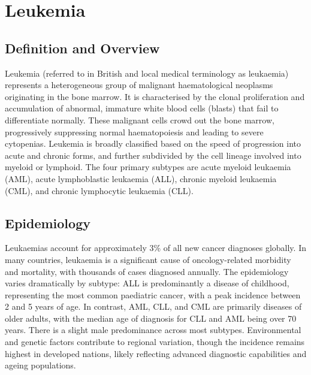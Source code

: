 \chapter{Leukemia}

\section*{Definition and Overview}
Leukemia (referred to in British and local medical terminology as leukaemia) represents a heterogeneous group of malignant haematological neoplasms originating in the bone marrow. It is characterised by the clonal proliferation and accumulation of abnormal, immature white blood cells (blasts) that fail to differentiate normally. These malignant cells crowd out the bone marrow, progressively suppressing normal haematopoiesis and leading to severe cytopenias. Leukemia is broadly classified based on the speed of progression into acute and chronic forms, and further subdivided by the cell lineage involved into myeloid or lymphoid. The four primary subtypes are acute myeloid leukaemia (AML), acute lymphoblastic leukaemia (ALL), chronic myeloid leukaemia (CML), and chronic lymphocytic leukaemia (CLL).

\section*{Epidemiology}
Leukaemias account for approximately 3\% of all new cancer diagnoses globally. In many countries, leukaemia is a significant cause of oncology-related morbidity and mortality, with thousands of cases diagnosed annually. The epidemiology varies dramatically by subtype: ALL is predominantly a disease of childhood, representing the most common paediatric cancer, with a peak incidence between 2 and 5 years of age. In contrast, AML, CLL, and CML are primarily diseases of older adults, with the median age of diagnosis for CLL and AML being over 70 years. There is a slight male predominance across most subtypes. Environmental and genetic factors contribute to regional variation, though the incidence remains highest in developed nations, likely reflecting advanced diagnostic capabilities and ageing populations.

